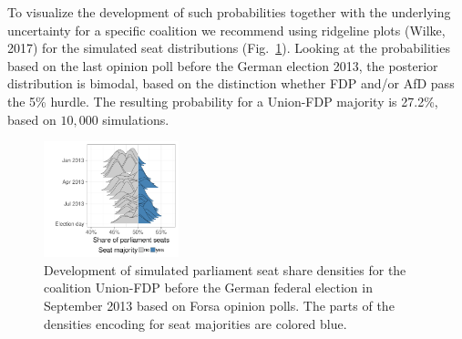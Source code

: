 \documentclass[twoside]{report}
\begin{document}
To visualize the development of such probabilities together with the underlying uncertainty for a specific coalition we recommend using ridgeline plots (Wilke, 2017) for the simulated seat distributions (Fig.~\ref{bauer:dens}). Looking at the probabilities based on the last opinion poll before the German election 2013, the posterior distribution is bimodal, based on the distinction whether FDP and/or AfD pass the 5\% hurdle. The resulting probability for a Union-FDP majority is 27.2\%, based on $10,000$ simulations.


\begin{figure}[!ht]\centering
\includegraphics[width=0.35\textwidth]{figures/bauer_seatDist_time.pdf}
\caption{\label{bauer:dens} Development of simulated parliament seat share densities for the coalition Union-FDP before the German federal election in September 2013 based on Forsa opinion polls. The parts of the densities encoding for seat majorities are colored blue.
}
\end{figure}
\end{document}
